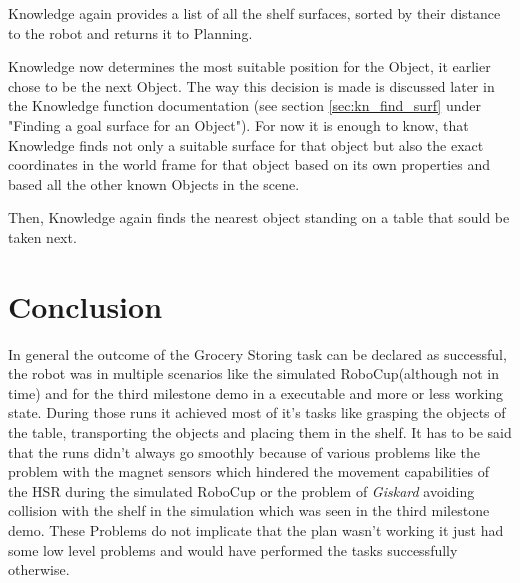 \documentclass[main.tex]{subfiles}
\begin{document}
	
	Knowledge again provides a list of all the shelf surfaces, sorted by their distance to the robot and returns it to Planning.
	
	
Knowledge now determines the most suitable position for the Object, it earlier chose to be the next Object. The way this decision is made is discussed later in the Knowledge function documentation (see section \ref{sec:kn_find_surf} under "Finding a goal surface for an Object"). For now it is enough to know, that Knowledge finds not only a suitable surface for that object but also the exact coordinates in the world frame for that object based on its own properties and based all the other known Objects in the scene.
	
	
	
	
	
	
	Then, Knowledge again finds the nearest object standing on a table that sould be taken next.
	
	
	
	
	\section{Conclusion}

	In general the outcome of the Grocery Storing task can be declared as successful, the robot was in multiple scenarios like the simulated RoboCup(although not in time) and for the third milestone demo in a executable and more or less working state. During those runs it achieved most of it's tasks like grasping the objects of the table, transporting the objects and placing them in the shelf.
	It has to be said that the runs didn't always go smoothly because of various problems like the problem with the magnet sensors which hindered the movement capabilities of the HSR during the simulated RoboCup or the problem of \textit{Giskard} avoiding collision with the shelf in the simulation which was seen in the third milestone demo.
	These Problems do not implicate that the plan wasn't working it just had some low level problems and would have performed the tasks successfully otherwise.
	
	
	\endgroup
	
\end{document}
